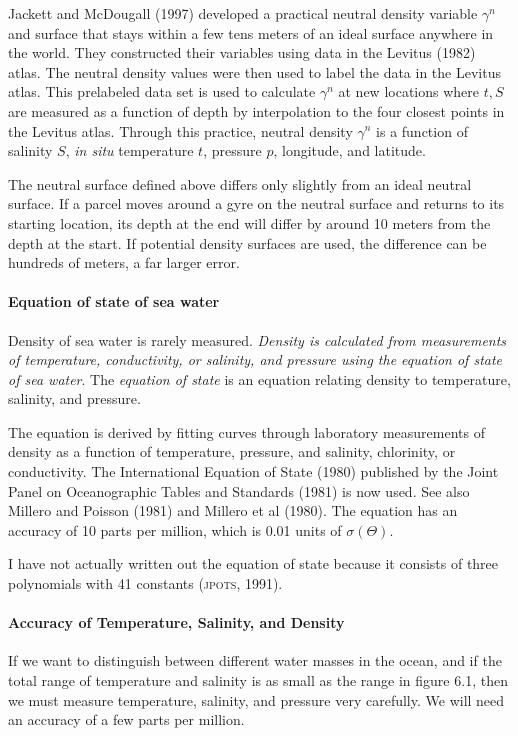 Jackett and McDougall (1997) developed a practical neutral density
variable $\gamma^n$ and surface that stays within a few tens meters of
an ideal surface anywhere in the world.  They constructed their
variables using data in the Levitus (1982) atlas. The neutral density
values were then used to label the data in the Levitus atlas. This
prelabeled data set is used to calculate $\gamma^n$ at new locations
where $t, S$ are measured as a function of depth by interpolation to
the four closest points in the Levitus atlas. Through this practice,
neutral density $\gamma^n$ is a function of salinity $S$, \textit{in
  situ} temperature $t$, pressure $p$, longitude, and
latitude.

The neutral surface defined above differs only slightly from an ideal
neutral surface. If a parcel moves around a gyre on the neutral
surface and returns to its starting location, its depth at the end
will differ by around 10 meters from the depth at the start. If
potential density surfaces are used, the difference can be hundreds of
meters, a far larger error.

\paragraph{Equation of state of sea water}
Density of sea water is rarely measured.
\textit{Density is calculated from measurements of temperature,
  conductivity, or salinity, and pressure using the equation of state
  of sea water}. The \textit{equation of state} is an equation
relating density to temperature, salinity, and pressure.

The equation is derived by fitting curves through laboratory
measurements of density as a function of temperature, pressure, and
salinity, chlorinity, or conductivity. The International Equation of
State (1980) published by the Joint Panel on Oceanographic Tables and
Standards (1981) is now used. See also Millero and Poisson (1981) and
Millero et al (1980). The equation has an
accuracy of 10 parts per million,
which is 0.01 units of $\sigma(\Theta)$.

I have not actually written out the equation of state because it
consists of three polynomials with 41 constants (\textsc{jpots},
1991).

\paragraph{Accuracy of Temperature, Salinity, and Density}
 If we want to
distinguish between different water masses in the ocean, and if the
total range of temperature and salinity is as small as the range in
figure 6.1, then we must measure temperature, salinity, and pressure
very carefully. We will need an accuracy of a few parts per million.

